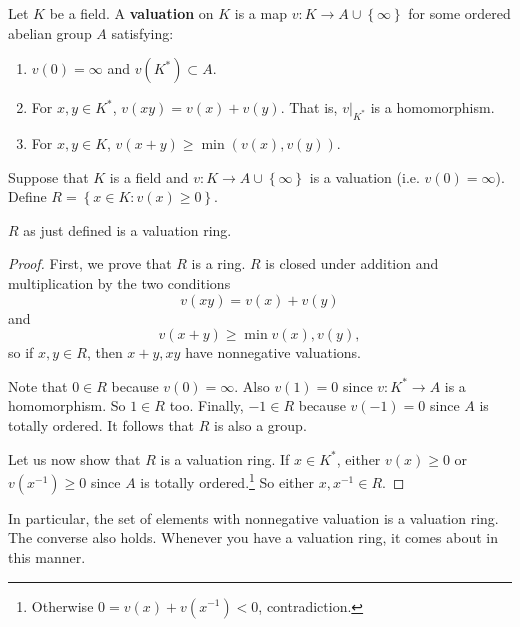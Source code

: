 \begin{definition}
Let $K$ be a field. A \textbf{valuation} on $K$ is a map $v: K \to A \cup
\left\{\infty\right\}$ for some
 ordered abelian group $A$  satisfying:
\begin{enumerate}
\item  $v(0) = \infty$ and $v(K^*) \subset A$.
\item For $x,y \in K^*$, $v(xy) = v(x) + v(y)$. That is, $v|_{K^*}$ is
a homomorphism.
\item For $x,y \in K$, $v(x+y) \geq \min (v(x), v(y))$.
\end{enumerate}

\end{definition}
Suppose that $K$ is a field and $v: K \to A \cup \left\{\infty\right\}$ is a
valuation (i.e. $v(0) = \infty$). Define $R = \left\{x \in K: v(x) \geq
0\right\}$.
\begin{proposition}
$R$ as just defined is a valuation ring.
\end{proposition}
\begin{proof}  First, we prove that $R$ is a ring.
$R$ is closed under addition and multiplication by the two conditions
\[ v(xy)  = v(x) + v(y)  \]
and
\[ v(x+y) \geq \min v(x), v(y) , \]
so if $x,y \in R$, then $x+y, xy$ have nonnegative valuations.

Note that $0 \in R$ because $v(0) = \infty$. Also $v(1) = 0$ since $v: K^*
\to A$
is a homomorphism. So $1 \in R$ too.
Finally, $-1 \in R$ because $v(-1) =0$ since $A$ is totally ordered.  It
follows that $R$ is also a group.

Let us now show that $R$ is a valuation ring. If $x \in K^*$, either $v(x) \geq
0$ or $v(x^{-1}) \geq 0$ since $A$ is totally ordered.\footnote{Otherwise $0
=v(x)+v(x^{-1}) < 0$, contradiction.} So either $x, x^{-1} \in R$.
\end{proof}

In particular, the set of elements with nonnegative valuation is a valuation
ring.
The converse also holds. Whenever you have a valuation ring, it comes about in
this manner.

